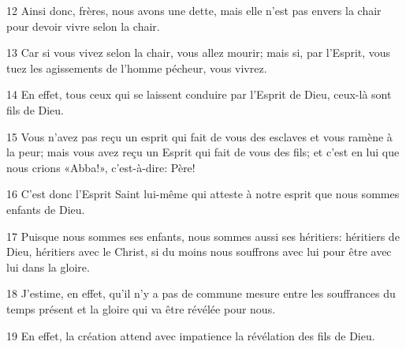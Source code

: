 12 Ainsi donc, frères, nous avons une dette, mais elle n’est pas envers la chair pour devoir vivre selon la chair.

13 Car si vous vivez selon la chair, vous allez mourir; mais si, par l’Esprit, vous tuez les agissements de l’homme pécheur, vous vivrez.

14 En effet, tous ceux qui se laissent conduire par l’Esprit de Dieu, ceux-là sont fils de Dieu.

15 Vous n’avez pas reçu un esprit qui fait de vous des esclaves et vous ramène à la peur; mais vous avez reçu un Esprit qui fait de vous des fils; et c’est en lui que nous crions «Abba!», c’est-à-dire: Père!

16 C’est donc l’Esprit Saint lui-même qui atteste à notre esprit que nous sommes enfants de Dieu.

17 Puisque nous sommes ses enfants, nous sommes aussi ses héritiers: héritiers de Dieu, héritiers avec le Christ, si du moins nous souffrons avec lui pour être avec lui dans la gloire.

18 J’estime, en effet, qu’il n’y a pas de commune mesure entre les souffrances du temps présent et la gloire qui va être révélée pour nous.

19 En effet, la création attend avec impatience la révélation des fils de Dieu.
